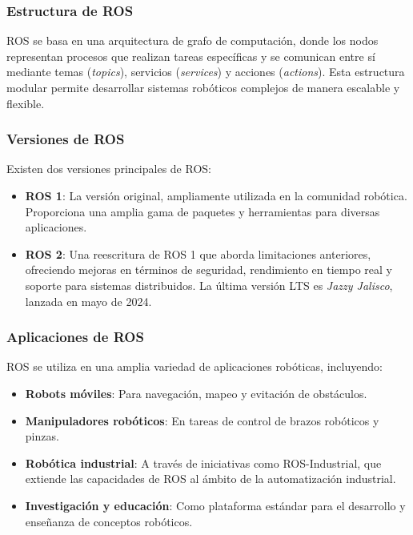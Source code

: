 \subsubsection{Estructura de ROS}

ROS se basa en una arquitectura de grafo de computación, donde los nodos representan procesos que realizan tareas específicas y se comunican entre sí mediante temas (\textit{topics}), servicios (\textit{services}) y acciones (\textit{actions}). Esta estructura modular permite desarrollar sistemas robóticos complejos de manera escalable y flexible.

\subsubsection{Versiones de ROS}

Existen dos versiones principales de ROS:

\begin{itemize}
	\item \textbf{ROS 1}: La versión original, ampliamente utilizada en la comunidad robótica. Proporciona una amplia gama de paquetes y herramientas para diversas aplicaciones.
	\item \textbf{ROS 2}: Una reescritura de ROS 1 que aborda limitaciones anteriores, ofreciendo mejoras en términos de seguridad, rendimiento en tiempo real y soporte para sistemas distribuidos. La última versión LTS es \textit{Jazzy Jalisco}, lanzada en mayo de 2024.
\end{itemize}

\subsubsection{Aplicaciones de ROS}

ROS se utiliza en una amplia variedad de aplicaciones robóticas, incluyendo:

\begin{itemize}
	\item \textbf{Robots móviles}: Para navegación, mapeo y evitación de obstáculos.
	\item \textbf{Manipuladores robóticos}: En tareas de control de brazos robóticos y pinzas.
	\item \textbf{Robótica industrial}: A través de iniciativas como ROS-Industrial, que extiende las capacidades de ROS al ámbito de la automatización industrial.
	\item \textbf{Investigación y educación}: Como plataforma estándar para el desarrollo y enseñanza de conceptos robóticos.
\end{itemize}

